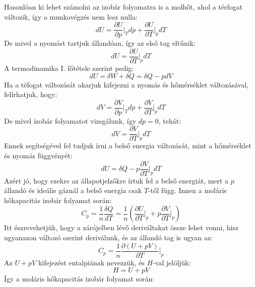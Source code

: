 \documentclass[../main.tex]{subfiles}
\begin{document}
Hasonlóan ki lehet számolni az izobár folyamatra is a molhőt, ahol a térfogat változik, így a munkavégzés nem lesz nulla:
\begin{equation}
    dU = \frac{\partial U}{\partial p}\bigg|_{T} dp + \frac{\partial U}{\partial T}\bigg|_{p} dT
\end{equation}
De mivel a nyomást tartjuk állandóan, így az első tag eltűnik:
\begin{equation}
    dU = \frac{\partial U}{\partial T}\bigg|_{p} dT
\end{equation}
A termodinamika I. főtétele szerint pedig:
\begin{equation}
    dU = \delta W + \delta Q = \delta Q - p dV
\end{equation}
Ha a téfogat változását akarjuk kifejezni a nyomás és hőmérséklet változásával, felírhatjuk, hogy:
\begin{equation}
    dV = \frac{\partial V}{\partial p}\bigg|_{T} dp + \frac{\partial V}{\partial T}\bigg|_{p} dT
\end{equation}
De mivel izobár folyamatot vizsgálunk, így $dp = 0$, tehát:
\begin{equation}
    dV = \frac{\partial V}{\partial T}\bigg|_{p} dT
\end{equation}
Ennek segítségével fel tudjuk írni a belső energia változását, mint a hőmérséklet és nyomás függvényét:
\begin{equation}
    dU = \delta Q - p \frac{\partial V}{\partial T}\bigg|_{p} dT
\end{equation}
Azért jó, hogy ezekre az állapotjelzőkre írtuk fel a belső energiát, mert a $p$ állandó és ideális gáznál a belső energia csak $T$-től függ.
Innen a moláris hőkapacitás izobár folyamat során:
\begin{equation}
    C_p = \frac{1}{n} \frac{\delta Q}{dT} = \frac{1}{n} \left(\frac{\partial U}{\partial T}\bigg|_{p} + p \frac{\partial V}{\partial T}\big|_{p}\right)
\end{equation}
Itt észrevehetjük, hogy a zárójelben lévő deriváltakat össze lehet vonni, hisz ugyanazon változó szerint deriválunk, és az állandó tag is ugyan az:
\begin{equation}
    C_p = \frac{1}{n} \frac{\partial \left(U + pV\right)}{\partial T}\bigg|_{p}
\end{equation}
Az $U + pV$ kifejezést entalpiának nevezzük, és $H$-val jelöljük:
\begin{equation}
    H = U + pV
\end{equation}
Így a moláris hőkapacitás izobár folyamat során:
\end{document}
